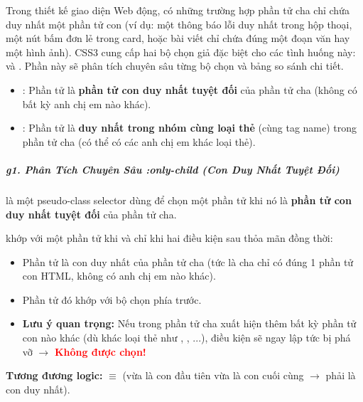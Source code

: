 Trong thiết kế giao diện Web động, có những trường hợp phần tử cha chỉ chứa duy nhất một phần tử con (ví dụ: một thông báo lỗi duy nhất trong hộp thoại, một nút bấm đơn lẻ trong card, hoặc bài viết chỉ chứa đúng một đoạn văn hay một hình ảnh). CSS3 cung cấp hai bộ chọn giả đặc biệt cho các tình huống này:  và . Phần này sẽ phân tích chuyên sâu từng bộ chọn và bảng so sánh chi tiết.

\begin{conceptBox}
\begin{itemize}[leftmargin=1.5em, itemsep=3pt, parsep=0pt]
    \item {}: Phần tử là \textbf{phần tử con duy nhất tuyệt đối} của phần tử cha (không có bất kỳ anh chị em nào khác).
    \item {}: Phần tử là \textbf{duy nhất trong nhóm cùng loại thẻ} (cùng tag name) trong phần tử cha (có thể có các anh chị em khác loại thẻ).
\end{itemize}
\end{conceptBox}


\subparagraph{g1. Phân Tích Chuyên Sâu :only-child (Con Duy Nhất Tuyệt Đối)}

 là một pseudo-class selector dùng để chọn một phần tử khi nó là \textbf{phần tử con duy nhất tuyệt đối} của phần tử cha.

\begin{conceptBox}
 khớp với một phần tử khi và chỉ khi hai điều kiện sau thỏa mãn đồng thời:
\begin{itemize}[leftmargin=1.5em, itemsep=2pt, parsep=0pt]
    \item Phần tử là con duy nhất của phần tử cha (tức là cha chỉ có đúng 1 phần tử con HTML, không có anh chị em nào khác).
    \item Phần tử đó khớp với bộ chọn  phía trước.
    \item \textbf{Lưu ý quan trọng:} Nếu trong phần tử cha xuất hiện thêm bất kỳ phần tử con nào khác (dù khác loại thẻ như , , ...), điều kiện  sẽ ngay lập tức bị phá vỡ $\rightarrow$ \textcolor{red}{\textbf{Không được chọn!}}
\end{itemize}
\par\vspace{4pt}
\textbf{Tương đương logic:}  $\equiv$  (vừa là con đầu tiên vừa là con cuối cùng $\rightarrow$ phải là con duy nhất).
\end{conceptBox}

